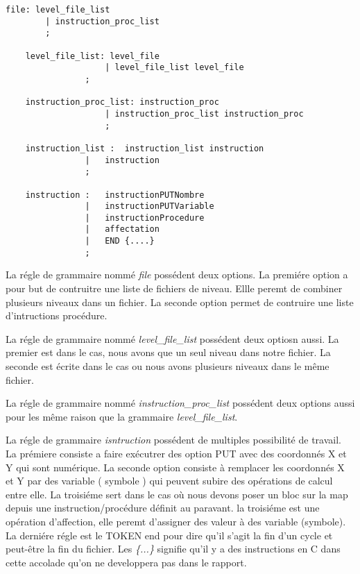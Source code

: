 \lstset{style=mystyle}
\begin{lstlisting}[caption=Régle généraliste pour la bonne lecture d'un fichier]
file: level_file_list
        | instruction_proc_list
        ;

    level_file_list: level_file
                    | level_file_list level_file
                ;

    instruction_proc_list: instruction_proc
                    | instruction_proc_list instruction_proc
                    ;

    instruction_list :  instruction_list instruction
                |   instruction
                ;

    instruction :   instructionPUTNombre
                |   instructionPUTVariable
                |   instructionProcedure
                |   affectation
                |   END {....}
                ;
\end{lstlisting}

La régle de grammaire nommé \textit{file} possédent deux options. La premiére option a pour but de contruitre une liste de fichiers de niveau.  Ellle peremt de combiner plusieurs niveaux dans un fichier. La seconde option permet de contruire une liste d'intructions procédure.

La régle de grammaire nommé \textit{level\_file\_list} possédent deux optiosn aussi. La premier est dans le cas, nous avons que un seul niveau dans notre fichier. La seconde est écrite dans le cas ou nous avons plusieurs niveaux dans le même fichier.

La régle de grammaire nommé \textit{instruction\_proc\_list} possédent deux options aussi pour les même raison que la grammaire \textit{level\_file\_list}.

La régle de grammaire \textit{isntruction} possédent de multiples possibilité de travail. La prémiere consiste a faire exécutrer des option PUT avec des coordonnés X et Y qui sont numérique. La seconde option consiste à remplacer les coordonnés X et Y par des variable ( symbole ) qui peuvent subire des opérations de calcul entre elle. La troisiéme sert dans le cas où nous devons poser un bloc sur la map depuis une instruction/procédure définit au paravant. la troisiéme est une opération d'affection, elle peremt d'assigner des valeur à des variable (symbole). La derniére régle est le TOKEN end pour dire qu'il s'agit la fin d'un cycle et peut-être la fin du fichier. Les \textit{\{...\}} signifie qu'il y a des instructions en C dans cette accolade qu'on ne developpera pas dans le rapport.
\newpage

